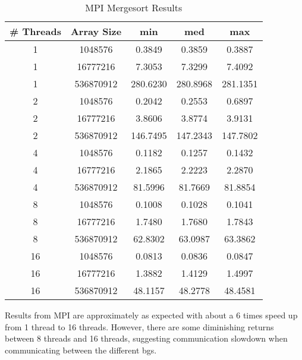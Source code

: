 \documentclass[conference,12pt]{IEEEtran}
\begin{document}
		\begin{table}[ht]
		\caption{MPI Mergesort Results} 
		\centering  
		\begin{tabular}{c c | c c c} 
		\hline\hline                        
		\# Threads & Array Size & min  & med & max\\ [0.5ex] %
		\hline                 
		1 & 1048576 & 0.3849 & 0.3859 & 0.3887  \\ 
		1 & 16777216 & 7.3053 & 7.3299 & 7.4092  \\
		1 & 536870912 & 280.6230  & 280.8968 &281.1351    \\
		\hline
		2 & 1048576 & 0.2042 & 0.2553 & 0.6897  \\ 
		2 & 16777216 & 3.8606 & 3.8774 & 3.9131  \\
		2 & 536870912 & 146.7495  & 147.2343 &147.7802   \\
		\hline
		4 & 1048576 & 0.1182 & 0.1257 & 0.1432  \\ 
		4 & 16777216 & 2.1865 & 2.2223 & 2.2870  \\
		4 & 536870912 & 81.5996  & 81.7669 &81.8854   \\
		\hline
		8 & 1048576 & 0.1008 & 0.1028 & 0.1041  \\ 
		8 & 16777216 & 1.7480 & 1.7680 & 1.7843  \\
		8 & 536870912 & 62.8302  & 63.0987 &63.3862   \\
		\hline
		16 & 1048576 & 0.0813 & 0.0836 & 0.0847  \\
		16 & 16777216 & 1.3882 & 1.4129 & 1.4997  \\
		16 & 536870912 & 48.1157  & 48.2778 &48.4581 \\
		\hline 
		\end{tabular}
		\label{table:mpimerge} %
		\end{table}
		Results from MPI are approximately as expected with about a 6 times speed up from 1 thread to 16 threads.  However, there are some diminishing returns between 8 threads and 16 threads, suggesting communication slowdown when communicating between the different bgs.
\end{document}
